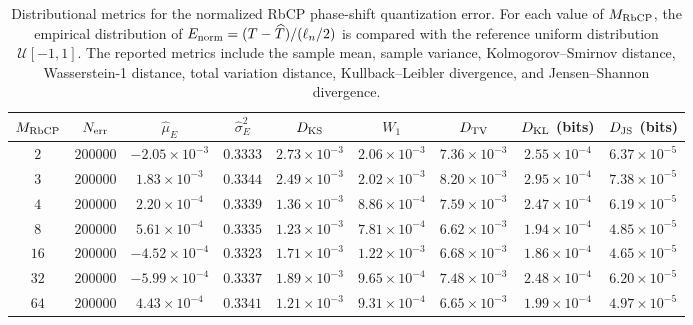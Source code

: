 \begin{table}[!t]
\centering
\scriptsize
\caption{Distributional metrics for the normalized RbCP phase-shift quantization error. For each value of $M_{\rm RbCP}$, the empirical distribution of $E_{\rm norm}=(T-\widehat{T})/(\ell_n/2)$ is compared with the reference uniform distribution $\mathcal{U}[-1,1]$. The reported metrics include the sample mean, sample variance, Kolmogorov--Smirnov distance, Wasserstein-1 distance, total variation distance, Kullback--Leibler divergence, and Jensen--Shannon divergence.}
\label{tab:quantization_error_distribution}
\begin{tabular}{ccccccccc}
\toprule
$M_{\rm RbCP}$ & $N_{\rm err}$ & $\widehat{\mu}_E$ & $\widehat{\sigma}_E^2$ & $D_{\rm KS}$ & $W_1$ & $D_{\rm TV}$ & $D_{\rm KL}$ (bits) & $D_{\rm JS}$ (bits) \\
\midrule
$2$ & $200000$ & $-2.05\times 10^{-3}$ & $0.3333$ & $2.73\times 10^{-3}$ & $2.06\times 10^{-3}$ & $7.36\times 10^{-3}$ & $2.55\times 10^{-4}$ & $6.37\times 10^{-5}$ \\
$3$ & $200000$ & $1.83\times 10^{-3}$ & $0.3344$ & $2.49\times 10^{-3}$ & $2.02\times 10^{-3}$ & $8.20\times 10^{-3}$ & $2.95\times 10^{-4}$ & $7.38\times 10^{-5}$ \\
$4$ & $200000$ & $2.20\times 10^{-4}$ & $0.3339$ & $1.36\times 10^{-3}$ & $8.86\times 10^{-4}$ & $7.59\times 10^{-3}$ & $2.47\times 10^{-4}$ & $6.19\times 10^{-5}$ \\
$8$ & $200000$ & $5.61\times 10^{-4}$ & $0.3335$ & $1.23\times 10^{-3}$ & $7.81\times 10^{-4}$ & $6.62\times 10^{-3}$ & $1.94\times 10^{-4}$ & $4.85\times 10^{-5}$ \\
$16$ & $200000$ & $-4.52\times 10^{-4}$ & $0.3323$ & $1.71\times 10^{-3}$ & $1.22\times 10^{-3}$ & $6.68\times 10^{-3}$ & $1.86\times 10^{-4}$ & $4.65\times 10^{-5}$ \\
$32$ & $200000$ & $-5.99\times 10^{-4}$ & $0.3337$ & $1.89\times 10^{-3}$ & $9.65\times 10^{-4}$ & $7.48\times 10^{-3}$ & $2.48\times 10^{-4}$ & $6.20\times 10^{-5}$ \\
$64$ & $200000$ & $4.43\times 10^{-4}$ & $0.3341$ & $1.21\times 10^{-3}$ & $9.31\times 10^{-4}$ & $6.65\times 10^{-3}$ & $1.99\times 10^{-4}$ & $4.97\times 10^{-5}$ \\
\bottomrule
\end{tabular}
\end{table}

